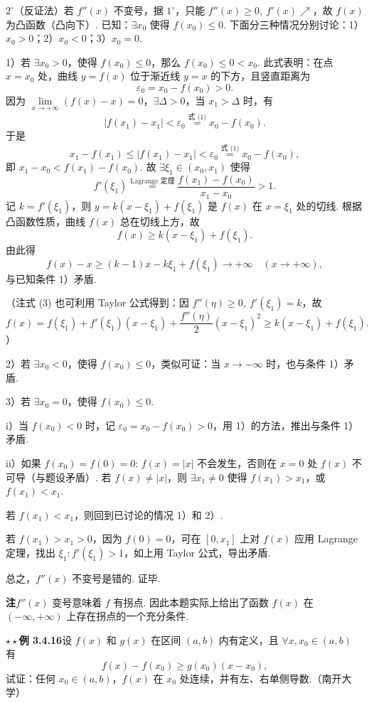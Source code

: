 \documentclass[UTF8,12pt,a4paper,fontset=fandol]{ctexart}
\begin{document}
$2^\circ$（反证法）若 $f''(x)$ 不变号，据 $1^\circ$，只能 $f''(x)\ge0,\ f'(x)\nearrow$，故 $f(x)$ 为凸函数（凸向下）. 已知：$\exists x_0$ 使得 $f(x_0)\le0$. 下面分三种情况分别讨论：1）$x_0>0$；2）$x_0<0$；3）$x_0=0$.

1）若 $\exists x_0>0$，使得 $f(x_0)\le0$，那么 $f(x_0)\le0<x_0$. 此式表明：在点 $x=x_0$ 处，曲线 $y=f(x)$ 位于渐近线 $y=x$ 的下方，且竖直距离为
\[
  \varepsilon_0=x_0-f(x_0)>0. \tag{1}
\]
因为 $\lim\limits_{x\to+\infty}(f(x)-x)=0$，$\exists\Delta>0$，当 $x_1>\Delta$ 时，有
\[
  |f(x_1)-x_1|<\varepsilon_0\overset{\text{式 (1)}}{=}x_0-f(x_0). \tag{2}
\]
于是
\[
  x_1-f(x_1)\le |f(x_1)-x_1|<\varepsilon_0\overset{\text{式 (1)}}{=}x_0-f(x_0),
\]
即 $x_1-x_0<f(x_1)-f(x_0)$. 故 $\exists\xi_1\in(x_0,x_1)$ 使得
\[
  f'(\xi_1)\overset{\text{Lagrange 定理}}{=}\frac{f(x_1)-f(x_0)}{x_1-x_0}>1.
\]
记 $k=f'(\xi_1)$，则 $y=k(x-\xi_1)+f(\xi_1)$ 是 $f(x)$ 在 $x=\xi_1$ 处的切线. 根据凸函数性质，曲线 $f(x)$ 总在切线上方，故
\[
  f(x)\ge k(x-\xi_1)+f(\xi_1). \tag{3}
\]
由此得
\[
  f(x)-x\ge (k-1)x-k\xi_1+f(\xi_1)\to+\infty\quad(x\to+\infty),
\]
与已知条件 1）矛盾.

（注\quad 式 (3) 也可利用 Taylor 公式得到：因 $f''(\eta)\ge0,\ f'(\xi_1)=k$，故
\[
  f(x)=f(\xi_1)+f'(\xi_1)(x-\xi_1)+\frac{f''(\eta)}2(x-\xi_1)^2\ge k(x-\xi_1)+f(\xi_1).
\]
）

2）若 $\exists x_0<0$，使得 $f(x_0)\le0$，类似可证：当 $x\to-\infty$ 时，也与条件 1）矛盾.

3）若 $\exists x_0=0$，使得 $f(x_0)\le0$.

i）当 $f(x_0)<0$ 时，记 $\varepsilon_0=x_0-f(x_0)>0$，用 1）的方法，推出与条件 1）矛盾.

ii）如果 $f(x_0)=f(0)=0$: $f(x)=|x|$ 不会发生，否则在 $x=0$ 处 $f(x)$ 不可导（与题设矛盾）. 若 $f(x)\ne |x|$，则 $\exists x_1\ne0$ 使得 $f(x_1)>x_1$，或 $f(x_1)<x_1$.

若 $f(x_1)<x_1$，则回到已讨论的情况 1）和 2）.

若 $f(x_1)>x_1>0$，因为 $f(0)=0$，可在 $[0,x_1]$ 上对 $f(x)$ 应用 Lagrange 定理，找出 $\xi_1:f'(\xi_1)>1$，如上用 Taylor 公式，导出矛盾.

总之，$f''(x)$ 不变号是错的. 证毕.

\noindent\textbf{注}\quad $f''(x)$ 变号意味着 $f$ 有拐点. 因此本题实际上给出了函数 $f(x)$ 在 $(-\infty,+\infty)$ 上存在拐点的一个充分条件.

\noindent\textbf{$\star\star$例 3.4.16}\quad 设 $f(x)$ 和 $g(x)$ 在区间 $(a,b)$ 内有定义，且 $\forall x,x_0\in(a,b)$ 有
\[
  f(x)-f(x_0)\ge g(x_0)(x-x_0), \tag{1}
\]
试证：任何 $x_0\in(a,b)$，$f(x)$ 在 $x_0$ 处连续，并有左、右单侧导数.（南开大学）
\end{document}

